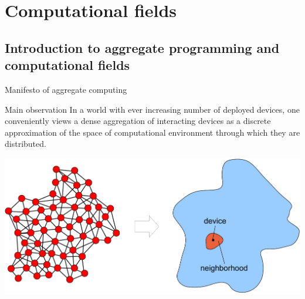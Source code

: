 \documentclass[presentation]{beamer} %
\begin{document}
\section{Computational fields}
\subsection{Introduction to aggregate programming and computational fields}
\begin{frame}{Manifesto of aggregate computing}
  \begin{block}{Main observation}
    In a world with ever increasing number of deployed devices, one conveniently views a dense aggregation of interacting devices as a discrete approximation of the space of computational environment through which they are distributed.
  \end{block}
  \begin{center}
    \includegraphics[width=.65\textwidth]{images/amorphous.pdf}
  \end{center}
\end{frame}
\end{document}
